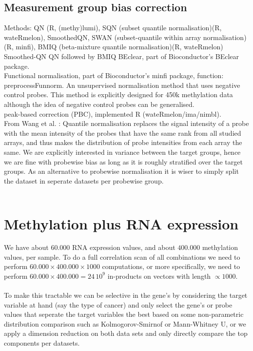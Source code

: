 \documentclass[a4paper,10pt]{article}
\begin{document}
\subsection{Measurement group bias correction}
%

Methods: 
QN  (R, (methy)lumi), 
SQN (subset quantile normalisation)(R, wateRmelon), 
SmoothedQN,
SWAN (subset-quantile within array normalisation)(R, minfi),
BMIQ (beta-mixture quantile normalisation)(R, wateRmelon)
Smoothed-QN
QN followed by BMIQ
%
BEclear, part of Bioconductor's BEclear package. \\
%
Functional normalisation, part of Bioconductor's minfi package, function: preprocessFunnorm. An unsupervised 
normalisation method that uses negative control probes. This method is explicitly designed for 450k methylation
data although the idea of negative control probes can be generalised. \\

peak-based correction (PBC), implemented R (wateRmelon/ima/nimbl). \\ 

From Wang et al. \cite{Wang2015}: Quantile normalisation replaces the signal intensity of a probe with the mean intensity of the probes that have the same rank from all studied arrays, and thus makes the distribution of probe intensities from each array the same. We are explicitly interested in variance between the target groups, hence we are fine with probewise bias
as long as it is roughly stratified over the target groups. As an alternative to probewise normalisation it is wiser
to simply split the dataset in seperate datasets per probewise group. \\ \\
%

\section{Methylation plus RNA expression}
%
We have about $60.000$ RNA expression values, and about $400.000$ methylation values, per sample.
To do a full correlation scan of all combinations we need to perform $60.000\times 400.000 \times 1000$ computations, 
or more specifically, we need to perform $60.000\times 400.000=24\,10^9$ in-products on vectors with length $\propto 1000$. \\ \\
%
To make this tractable we can be selective in the gene's by considering the target variable at hand (say the type 
of cancer) and only select the gene's or probe values that seperate the target variables the best based 
on some non-parametric distribution comparison such as Kolmogorov-Smirnof or Mann-Whitney U, or we apply 
a dimension reduction on both data sets and only directly compare  the top components per datasets.
\end{document}
